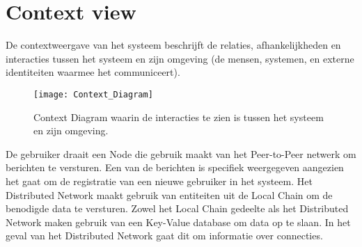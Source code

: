 \section{Context view}

De contextweergave van het systeem beschrijft de relaties, afhankelijkheden en interacties tussen het systeem en zijn omgeving (de mensen, systemen, en externe identiteiten waarmee het communiceert).

\begin{figure}[h]
  \centering
  \texttt{[image: Context\_Diagram]}
  \caption[Context Diagram] {
    Context Diagram waarin de interacties te zien is tussen het systeem en zijn omgeving.
  }
\end{figure}

De gebruiker draait een Node die gebruik maakt van het Peer-to-Peer netwerk om berichten te versturen. Een van de berichten is specifiek weergegeven aangezien het gaat om de registratie van een nieuwe gebruiker in het systeem. Het Distributed Network maakt gebruik van entiteiten uit de Local Chain om de benodigde data te versturen. Zowel het Local Chain gedeelte als het Distributed Network maken gebruik van een Key-Value database om data op te slaan. In het geval van het Distributed Network gaat dit om informatie over connecties.